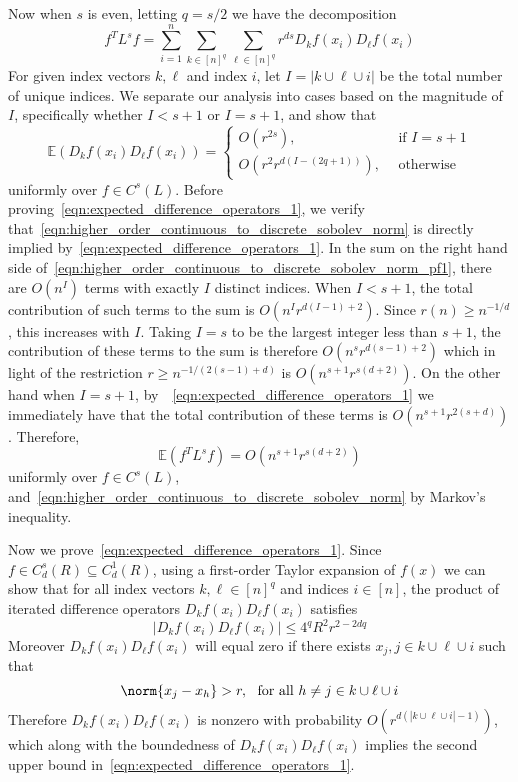 \documentclass{article}
\newcommand{\abs}[1]{\left \lvert #1 \right \rvert}
\newcommand{\1}{\mathbf{1}}
\newcommand{\Ebb}{\mathbb{E}}
\theoremstyle{alden}
\theoremstyle{aldenthm}
\theoremstyle{definition}
\theoremstyle{remark}
\begin{document}
Now when $s$ is even, letting $q = s/2$ we have the decomposition
\begin{equation}
\label{eqn:higher_order_continuous_to_discrete_sobolev_norm_pf1}
f^T L^s f =  \sum_{i = 1}^{n} \sum_{k \in [n]^q} \sum_{\ell \in [n]^q} r^{ds} D_kf(x_i) D_{\ell}f(x_i)
\end{equation}
For given index vectors $k,\ell$ and index $i$, let $I = \abs{k \cup \ell \cup i}$ be the total number of unique indices. We separate our analysis into cases based on the magnitude of $I$, specifically whether $I < s + 1$ or $I = s + 1$, and show that
\begin{equation}
\label{eqn:expected_difference_operators_1}
\Ebb(D_kf(x_i) D_\ell f(x_i)) =
\begin{cases*}
O(r^{2s}), & ~~\textrm{if $I = s + 1$} \\
O(r^{2} r^{d(I - (2q + 1))}), & ~~\textrm{otherwise}~ 
\end{cases*}
\end{equation}
uniformly over $f \in C^{s}(L)$. 
Before proving~\eqref{eqn:expected_difference_operators_1}, we verify that~\eqref{eqn:higher_order_continuous_to_discrete_sobolev_norm} is directly implied by~\eqref{eqn:expected_difference_operators_1}. In the sum on the right hand side of~\eqref{eqn:higher_order_continuous_to_discrete_sobolev_norm_pf1}, there are $O(n^{I})$ terms with exactly $I$ distinct indices. When $I < s + 1$, the total contribution of such terms to the sum is $O(n^{I}r^{d(I - 1) + 2})$. Since $r(n) \geq n^{-1/d}$, this increases with $I$. Taking $I = s$ to be the largest integer less than $s + 1$, the contribution of these terms to the sum is therefore $O(n^sr^{d(s - 1) + 2})$ which in light of the restriction $r \geq n^{-1/(2(s - 1) + d)}$ is $O(n^{s+1}r^{s(d +2)})$. On the other hand when $I = s + 1$, by~~\eqref{eqn:expected_difference_operators_1} we immediately have that the total contribution of these terms is $O(n^{s + 1}r^{2(s + d)})$. Therefore,
\begin{equation*}
\Ebb(f^T L^s f) = O(n^{s+1}r^{s(d+2)})
\end{equation*}
uniformly over $f \in C^s(L)$, and~\eqref{eqn:higher_order_continuous_to_discrete_sobolev_norm} by Markov's inequality.

Now we prove~\eqref{eqn:expected_difference_operators_1}. Since $f \in C_d^s(R) \subseteq C_d^1(R)$, using a first-order Taylor expansion of $f(x)$ we can show that for all index vectors $k,\ell \in [n]^q$ and indices $i \in [n]$, the product of iterated difference operators $D_kf(x_i) D_{\ell}f(x_i)$ satisfies
\begin{equation*}
\abs{D_kf(x_i) D_{\ell}f(x_i)} \leq 4^{q} R^2 r^{2 - 2dq}
\end{equation*}
Moreover $D_kf(x_i) D_{\ell}f(x_i)$ will equal zero if there exists $x_j, j \in k \cup \ell \cup i$ such that
\begin{equation*}
\norm{x_j - x_h} > r,~~\textrm{for all $h \neq j \in k \cup \ell \cup i$}
\end{equation*}
Therefore $D_kf(x_i) D_{\ell}f(x_i)$ is nonzero with probability $O(r^{d(\abs{k \cup \ell \cup i} - 1)})$, which along with the boundedness of $D_kf(x_i) D_{\ell}f(x_i)$ implies the second upper bound in~\eqref{eqn:expected_difference_operators_1}.
\end{document}
